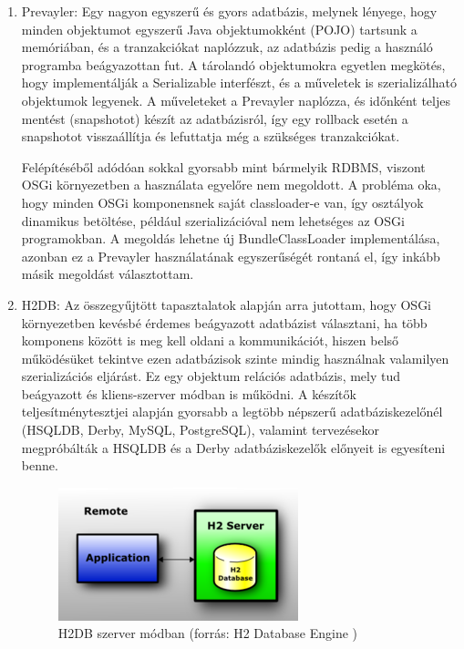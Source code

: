 \begin{enumerate}
	\item Prevayler: Egy nagyon egyszerű és gyors adatbázis, melynek lényege, hogy minden objektumot egyszerű Java objektumokként (POJO) tartsunk a memóriában, és a tranzakciókat naplózzuk, az adatbázis pedig a használó programba beágyazottan fut. A tárolandó objektumokra egyetlen megkötés, hogy implementálják a Serializable interfészt, és a műveletek is szerializálható objektumok legyenek. A műveleteket a Prevayler naplózza, és időnként teljes mentést (snapshotot) készít az adatbázisról, így egy rollback esetén a snapshotot visszaállítja és lefuttatja még a szükséges tranzakciókat.
	
Felépítéséből adódóan sokkal gyorsabb mint bármelyik RDBMS, viszont OSGi környezetben a használata egyelőre nem megoldott. A probléma oka, hogy minden OSGi komponensnek saját classloader-e van, így osztályok dinamikus betöltése, például szerializációval nem lehetséges az OSGi programokban. A megoldás lehetne új BundleClassLoader implementálása, azonban ez a Prevayler használatának egyszerűségét rontaná el, így inkább másik megoldást választottam.

    \item H2DB: Az összegyűjtött tapasztalatok alapján arra jutottam, hogy OSGi környezetben kevésbé érdemes beágyazott adatbázist választani, ha több komponens között is meg kell oldani a kommunikációt, hiszen belső működésüket tekintve ezen adatbázisok szinte mindig használnak valamilyen szerializációs eljárást. Ez egy objektum relációs adatbázis, mely tud beágyazott és kliens-szerver módban is működni. A készítők teljesítménytesztjei alapján gyorsabb a legtöbb népszerű adatbáziskezelőnél (HSQLDB, Derby, MySQL, PostgreSQL), valamint tervezésekor megpróbálták a HSQLDB és a Derby adatbáziskezelők előnyeit is egyesíteni benne.
    
\begin{figure}[htp]
\centering
\includegraphics[scale=1.0]{img/h2db}
\caption{H2DB szerver módban (forrás: H2 Database Engine \cite{h2db})}
\label{fig:h2db}
\end{figure}


\end{enumerate}
